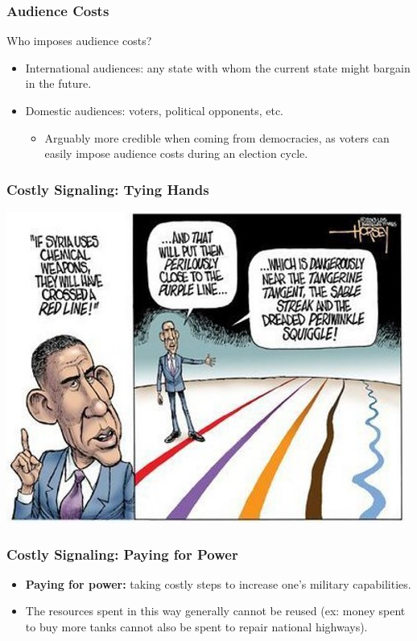 \documentclass[handout]{beamer}
\begin{document}
\begin{frame}
\frametitle{\LARGE{Audience Costs}}
Who imposes audience costs? \pause
\begin{itemize}
	\item International audiences: any state with whom the current state might bargain in the future.
	\item Domestic audiences: voters, political opponents, etc. \pause
	\begin{itemize}
		\item Arguably more credible when coming from democracies, as voters can easily impose audience costs during an election cycle.
	\end{itemize}
\end{itemize}
\end{frame}

\begin{frame}
	\frametitle{\LARGE{Costly Signaling: Tying Hands}}
	\centering
	\includegraphics[width=\textwidth,height=0.8\textheight,keepaspectratio]{obamaredline.jpg}
\end{frame}


\begin{frame} 
	\frametitle{\LARGE{Costly Signaling: Paying for Power}}
	\begin{itemize}
		\item \textbf{Paying for power:} taking costly steps to increase one's military capabilities. \pause
		\item The resources spent in this way generally cannot be reused (ex: money spent to buy more tanks cannot also be spent to repair national highways). 

	\end{itemize}
\end{frame}
\end{document}
